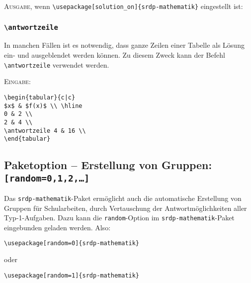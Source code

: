 \documentclass[a4paper,12pt]{article}
\begin{document}
\setcounter{Antworten}{0}
\leer

\textsc{Ausgabe}, wenn \texttt{\textbackslash usepackage[solution\_on]\{srdp-mathematik\}} eingestellt ist:\\

\setcounter{Antworten}{1}

\subsubsection{\texttt{\textbackslash antwortzeile}}
In manchen Fällen ist es notwendig, dass ganze Zeilen einer Tabelle als Lösung ein- und ausgeblendet werden können. Zu diesem Zweck kann der Befehl \texttt{\textbackslash antwortzeile} verwendet werden.\leer

\textsc{Eingabe:}

\begin{verbatim}
\begin{tabular}{c|c}
$x$ & $f(x)$ \\ \hline
0 & 2 \\
2 & 4 \\
\antwortzeile 4 & 16 \\
\end{tabular}
\end{verbatim}


\subsection{Paketoption -- Erstellung von Gruppen: \texttt{[random=0,1,2,\ldots]}}
Das \texttt{srdp-mathematik}-Paket ermöglicht auch die automatische Erstellung von Gruppen für Schularbeiten, durch Vertauschung der Antwortmöglichkeiten aller Typ-1-Aufgaben. Dazu kann die \texttt{random}-Option im \texttt{srdp-mathematik}-Paket eingebunden geladen werden. Also:

\begin{verbatim}
\usepackage[random=0]{srdp-mathematik}
\end{verbatim}

oder

\begin{verbatim}
\usepackage[random=1]{srdp-mathematik}
\end{verbatim}
\end{document}
